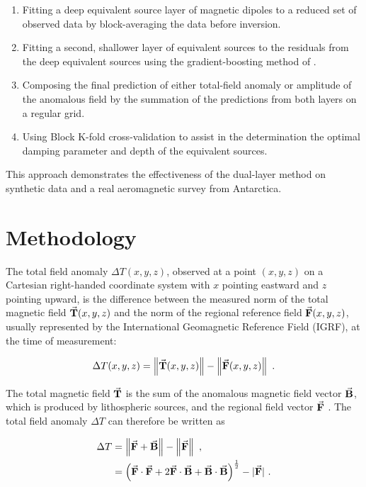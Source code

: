 \begin{enumerate}
  \item Fitting a deep equivalent source layer of magnetic dipoles to a reduced set of observed data by block-averaging the data before inversion.
  \item Fitting a second, shallower layer of equivalent sources to the residuals from the deep equivalent sources using the gradient-boosting method of \citet{Soler2021}.
  \item Composing the final prediction of either total-field anomaly or amplitude of the anomalous field by the summation of the predictions from both layers on a regular grid.
  \item Using Block K-fold cross-validation to assist in the determination the optimal damping parameter and depth of the equivalent sources.
\end{enumerate}

\noindent
This approach demonstrates the effectiveness of the dual-layer method on synthetic data and a real aeromagnetic survey from Antarctica.


\section{Methodology}

The total field anomaly $\Delta T(x, y, z)$, observed at a point $(x, y, z)$ on a Cartesian right-handed coordinate system with $x$ pointing eastward and $z$ pointing upward, is the difference between the measured norm of the total magnetic field $\vec{\mathbf{T}}(x, y, z)$ and the norm of the regional reference field $\vec{\mathbf{F}}(x, y, z)$, usually represented by the International Geomagnetic Reference Field (IGRF), at the time of measurement:

\begin{equation}
    \Delta T(x, y, z) =
    \left\lVert\vec{\mathbf{T}}(x, y, z)\right\rVert
    - \left\lVert\vec{\mathbf{F}}(x, y, z)\right\rVert
    \ .
\end{equation}

\noindent
The total magnetic field $\vec{\mathbf{T}}$ is the sum of the anomalous magnetic field vector $\vec{\mathbf{B}}$, which is produced by lithospheric sources, and the regional field vector $\vec{\mathbf{F}}$ \citep{Blakley1995, Langel1998, OliveiraJr2015}. The total field anomaly $\Delta T$ can therefore be written as

\begin{align}
    \Delta T &=
    \left\lVert\vec{\mathbf{F}} + \vec{\mathbf{B}}\right\rVert - \left\lVert\vec{\mathbf{F}}\right\rVert\ ,
    \\
    &= \left(
        \vec{\mathbf{F}} \cdot \vec{\mathbf{F}} + 2\vec{\mathbf{F}} \cdot \vec{\mathbf{B}} + \vec{\mathbf{B}} \cdot \vec{\mathbf{B}}\right)^{\frac{1}{2}} - \vert \vec{\mathbf{F}} \vert
    \ .
\end{align}

